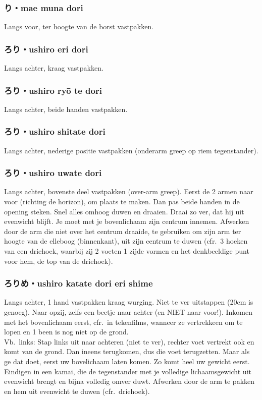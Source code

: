 \subsubsection{り・mae muna dori}
Langs voor, ter hoogte van de borst vastpakken.

\subsubsection{ろり・ushiro eri dori}
Langs achter, kraag vastpakken.

\subsubsection{ろり・ushiro ry\={o} te dori}
Langs achter, beide handen vastpakken.

\subsubsection{ろり・ushiro shitate dori}
Langs achter, nederige positie vastpakken (onderarm greep op riem tegenstander).

\subsubsection{ろり・ushiro uwate dori}
Langs achter, bovenste deel vastpakken (over-arm greep). Eerst de 2 armen naar voor (richting de horizon), om plaats te maken. Dan pas beide handen in de opening steken. Snel alles omhoog duwen en draaien. Draai zo ver, dat hij uit evenwicht blijft. Je moet met je bovenlichaam zijn centrum innemen. Afwerken door de arm die niet over het centrum draaide, te gebruiken om zijn arm ter hoogte van de elleboog (binnenkant), uit zijn centrum te duwen (cfr.\ 3 hoeken van een driehoek, waarbij zij 2 voeten 1 zijde vormen en het denkbeeldige punt voor hem, de top van de driehoek).

\subsubsection{ろりめ・ushiro katate dori eri shime}
Langs achter, 1 hand vastpakken kraag wurging. Niet te ver uitstappen (20cm is genoeg). Naar opzij, zelfs een beetje naar achter (en NIET naar voor!). Inkomen met het bovenlichaam eerst, cfr.\ in tekenfilms, wanneer ze vertrekkeen om te lopen en 1 been is nog niet op de grond.\\
Vb.\ links: Stap links uit naar achteren (niet te ver), rechter voet vertrekt ook en komt van de grond. Dan ineens terugkomen, dus die voet terugzetten. Maar als ge dat doet, eerst uw bovelichaam laten komen. Zo komt heel uw gewicht eerst. Eindigen in een kamai, die de tegenstander met je volledige lichaamsgewicht uit evenwicht brengt en bijna volledig omver duwt. Afwerken door de arm te pakken en hem uit evenwicht te duwen (cfr.\ driehoek).

